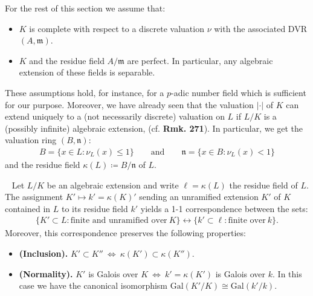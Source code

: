 \documentclass[12pt,a4paper,footinclude=true,headinclude=true]{scrbook} %
\newenvironment{proposition}[2][]
{\renewcommand\theinnercustomprop{#2}\innercustomprop[#1] 
\begin{mdframed}[backgroundcolor=gray!20]\ }
{\end{mdframed}\endinnercustomprop}
\begin{document}
For the rest of this section we assume that:
\begin{itemize}
    \item $K$ is complete with respect to a discrete valuation $\nu$ with the associated DVR $(A,\mathfrak{m})$.
    \item $K$ and the residue field $A/\mathfrak{m}$ are perfect. In particular, any algebraic extension of these fields is separable.
\end{itemize}
These assumptions hold, for instance, for a $p$-adic number field which is sufficient for our purpose. Moreover, we have already seen that the valuation $|\cdot|$ of $K$ can extend uniquely to a (not necessarily discrete) valuation on $L$ if $L/K$ is a (possibly infinite) algebraic extension, (cf. \textbf{Rmk. 271}). In particular, we get the valuation ring $(B,\mathfrak{n})$:
\begin{align*}
    B=\{x\in L:\nu_L(x)\leq1\}\qquad\text{and}\qquad \mathfrak{n}=\{x\in B:\nu_L(x)<1\}
\end{align*}
and the residue field $\kappa(L)\coloneqq B/\mathfrak{n}$ of $L$.
\newpage
\begin{proposition}{275}
    Let $L/K$ be an algebraic extension and write $\ell=\kappa(L)$ the residue field of $L$. The assignment $K'\mapsto k'=\kappa(K)'$ sending an unramified extension $K'$ of $K$ contained in $L$ to its residue field $k'$ yields a 1-1 correspondence between the sets:
    \begin{align*}
        \{K'\subset L:\text{finite and unramified over}\ K\}\longleftrightarrow \{k'\subset\ell:\text{finite over}\ k\}.
    \end{align*}
    Moreover, this correspondence preserves the following properties:
    \begin{itemize}
        \item[(a)] \textbf{(Inclusion).} $K'\subset K''\ \Leftrightarrow\ \kappa(K')\subset\kappa(K'')$.
        \item[(b)] \textbf{(Normality).} $K'$ is Galois over $K\ \Leftrightarrow\ k'=\kappa(K')$ is Galois over $k$. In this case we have the canonical isomorphism $\mathrm{Gal}(K'/K)\cong\mathrm{Gal}(k'/k)$.
    \end{itemize}
\end{proposition}
\end{document}

